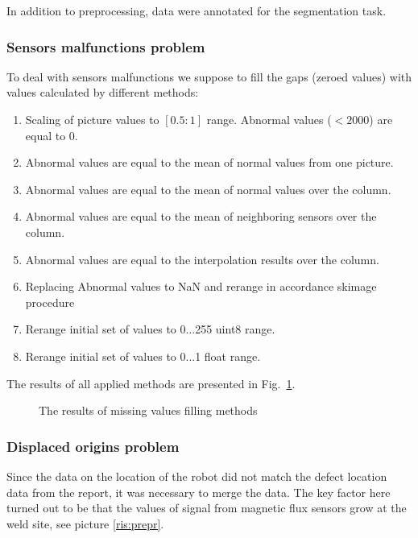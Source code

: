 In addition to preprocessing, data were annotated for the segmentation task.

\subsubsection{Sensors malfunctions problem}
To deal with sensors malfunctions we suppose to fill the gaps (zeroed values) with values calculated by different methods:
\begin{enumerate}
	\item Scaling of picture values to $[0.5:1]$ range. Abnormal values ($<2000$) are equal to 0.
	\item Abnormal values are equal to the mean of normal values from one picture.
	\item Abnormal values are equal to the mean of normal values over the column.
	\item Abnormal values are equal to the mean of neighboring sensors over the column.
	\item Abnormal values are equal to the interpolation results over the column.
	\item Replacing Abnormal values to NaN and rerange in accordance  skimage procedure 
	\item Rerange initial set of values to 0...255 uint8 range.
	\item Rerange initial set of values to 0...1 float range.
	
	
\end{enumerate}
The results of all applied methods are presented in Fig.~\ref{ris:filling_example}.
\begin{figure}[ht]
	\caption{The results of missing values filling methods}
	\label{ris:filling_example}
\end{figure}

\subsubsection{Displaced origins problem}

Since the data on the location of the robot did not match the defect location data from the report, it was necessary to merge the data. The key factor here turned out to be that the values of signal from magnetic flux sensors grow at the weld site, see picture \ref{ris:prepr}. 

